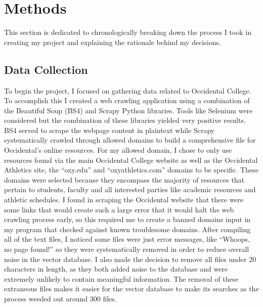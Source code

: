 \documentclass[10pt,twocolumn]{article}
\begin{document}
\section{Methods}
This section is dedicated to chronologically breaking down the process I took in creating my project and explaining the rationale behind my decisions.

\subsection{Data Collection}
To begin the project, I focused on gathering data related to Occidental College. To accomplish this I created a web crawling application using a combination of the Beautiful Soup (BS4) and Scrapy Python libraries. Tools like Selenium were considered but the combination of these libraries yielded very positive results. BS4 served to scrape the webpage content in plaintext while Scrapy systematically crawled through allowed domains to build a comprehensive file for Occidental’s online resources. For my allowed domain, I chose to only use resources found via the main Occidental College website as well as the Occidental Athletics site, the “oxy.edu” and “oxyathletics.com” domains to be specific. These domains were selected because they encompass the majority of resources that pertain to students, faculty and all interested parties like academic resources and athletic schedules. I found in scraping the Occidental website that there were some links that would create such a large error that it would halt the web crawling process early, so this required me to create a banned domains input in my program that checked against known troublesome domains. After compiling all of the text files, I noticed some files were just error messages, like “Whoops, no page found!” so they were systematically removed in order to reduce overall noise in the vector database. I also made the decision to remove all files under 20 characters in length, as they both added noise to the database and were extremely unlikely to contain meaningful information. The removal of these extraneous files makes it easier for the vector database to make its searches as the process weeded out around 300 files.
\end{document}
